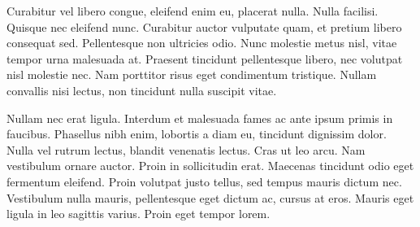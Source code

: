 \documentclass[2pt,a4paper,twoside ]{article}
\begin{document}
\begin{multicols}{2}
Curabitur vel libero congue, eleifend enim eu, placerat nulla. Nulla facilisi. Quisque nec eleifend nunc. Curabitur auctor vulputate quam, et pretium libero consequat sed. Pellentesque non ultricies odio. Nunc molestie metus nisl, vitae tempor urna malesuada at. Praesent tincidunt pellentesque libero, nec volutpat nisl molestie nec. Nam porttitor risus eget condimentum tristique. Nullam convallis nisi lectus, non tincidunt nulla suscipit vitae.

Nullam nec erat ligula. Interdum et malesuada fames ac ante ipsum primis in faucibus. Phasellus nibh enim, lobortis a diam eu, tincidunt dignissim dolor. Nulla vel rutrum lectus, blandit venenatis lectus. Cras ut leo arcu. Nam vestibulum ornare auctor. Proin in sollicitudin erat. Maecenas tincidunt odio eget fermentum eleifend. Proin volutpat justo tellus, sed tempus mauris dictum nec. Vestibulum nulla mauris, pellentesque eget dictum ac, cursus at eros. Mauris eget ligula in leo sagittis varius. Proin eget tempor lorem.
\end{multicols}
\end{document}
